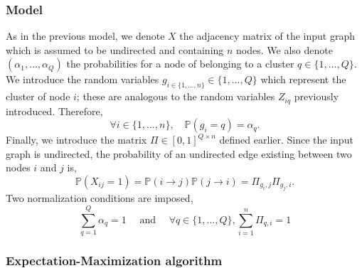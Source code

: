 \documentclass[switch, 12pt]{article}
\newcommand{\intset}[2]{\{#1, ..., #2\}}
\begin{document}
\begin{multicols}{2}
    \subsubsection{Model}

    As in the previous model, we denote $X$ the adjacency matrix of the input graph which is assumed to be undirected and containing $n$ nodes. We also denote $(\alpha_1, \ldots, \alpha_Q)$ the probabilities for a node of belonging to a cluster $q \in \intset{1}{Q}$. We introduce the random variables $g_{i \in \intset{1}{n}} \in \intset{1}{Q}$ which represent the cluster of node $i$; these are analogous to the random variables $Z_{iq}$ previously introduced. Therefore,
    \begin{equation}
        \forall i \in \intset{1}{n}, \quad \mathbb{P}(g_i = q) = \alpha_q.
    \end{equation}
    Finally, we introduce the matrix $\Pi \in [0, 1]^{Q \times n}$ defined earlier.
    Since the input graph is undirected,
    the probability of an undirected edge existing between two nodes $i$ and $j$ is,
    \begin{equation}
        \mathbb{P}(X_{ij} = 1) = \mathbb{P}(i \rightarrow j) \mathbb{P}(j \rightarrow i) = \Pi_{g_i, j} \Pi_{g_j, i}.
    \end{equation}
    Two normalization conditions are imposed,
    \begin{equation}
        \sum_{q = 1}^Q \alpha_q = 1 \quad \text{ and } \quad \forall q \in \intset{1}{Q}, \sum_{i = 1}^n \Pi_{q, i} = 1
    \end{equation}
    \subsubsection{Expectation-Maximization algorithm}


\end{multicols}
\end{document}
